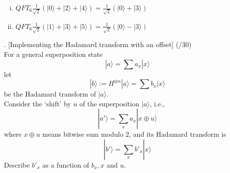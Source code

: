\documentclass[11pt]{article}
\newenvironment{solution}{\begin{mdframed}[skipabove=\baselineskip,innertopmargin=\baselineskip,innerbottommargin=\baselineskip]
  }{\end{mdframed}}
\begin{document}
\begin{solution}
\begin{enumerate}[(i)]
    \item $QFT_6 \frac{1}{\sqrt{2}}(|0\rangle +|2\rangle+|4\rangle) = \frac{1}{\sqrt{2}}(|0\rangle +|3\rangle)$  
    
    \item $QFT_6 \frac{1}{\sqrt{2}}(|1\rangle +|3\rangle+|5\rangle) = \frac{1}{\sqrt{2}}(|0\rangle -|3\rangle)$ 
\end{enumerate}
\end{solution}

\newpage

. [Implementing the Hadamard transform with an offset] (/30)
\\
For a general superposition state
$$|a\rangle = \sum a_x|x\rangle$$
let
$$|b\rangle := H^{\otimes n}|a\rangle = \sum b_x|x\rangle$$
be the Hadamard transform of $|a\rangle$. \\
Consider the ‘shift’ by $u$ of the superposition $|a\rangle$, i.e.,
$$|a'\rangle = \sum_x a_x|x\oplus u\rangle$$
where $x\oplus u$ means bitwise sum modulo 2, and its Hadamard transform is
$$|b'\rangle = \sum_x b'_x|x\rangle$$
Describe $b'_x$ as a function of $b_x,x$ and $u$. \\ \vspace{2em} \\
\end{document}
